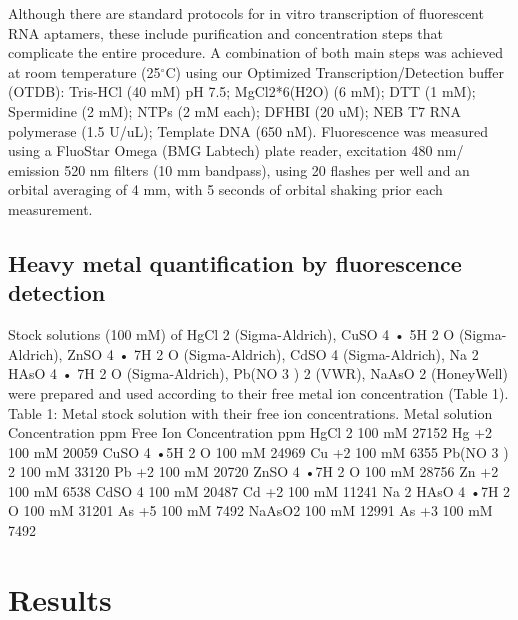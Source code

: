 Although there are standard protocols for in vitro transcription of fluorescent RNA aptamers, these include purification and concentration steps that complicate the entire procedure. A combination of both main steps was achieved at room temperature (25$^{\circ}$C) using our Optimized Transcription/Detection buffer (OTDB): Tris-HCl (40 mM) pH 7.5; MgCl2*6(H2O) (6 mM); DTT (1 mM); Spermidine (2 mM); NTPs (2 mM each); DFHBI (20 uM); NEB T7 RNA polymerase (1.5 U/uL); Template DNA (650 nM). 
Fluorescence was measured using a FluoStar Omega (BMG Labtech) plate reader, excitation 480 nm/ emission 520 nm filters (10 mm bandpass), using 20 flashes per well and an orbital averaging of 4 mm, with 5 seconds of orbital shaking prior each measurement. 

\subsection*{Heavy metal quantification by fluorescence detection}
Stock solutions (100 mM) of HgCl 2 (Sigma-Aldrich), CuSO 4 • 5H 2 O (Sigma-Aldrich), ZnSO 4 • 7H 2 O
(Sigma-Aldrich), CdSO 4 (Sigma-Aldrich), Na 2 HAsO 4 • 7H 2 O (Sigma-Aldrich), Pb(NO 3 ) 2 (VWR), NaAsO 2
(HoneyWell) were prepared and used according to their free metal ion concentration (Table 1).
Table 1: Metal stock solution with their free ion concentrations.
Metal solution Concentration ppm Free Ion Concentration ppm
HgCl 2 100 mM 27152 Hg +2 100 mM 20059
CuSO 4 •5H 2 O 100 mM 24969 Cu +2 100 mM 6355
Pb(NO 3 ) 2 100 mM 33120 Pb +2 100 mM 20720
ZnSO 4 •7H 2 O 100 mM 28756 Zn +2 100 mM 6538
CdSO 4 100 mM 20487 Cd +2 100 mM 11241
Na 2 HAsO 4 •7H 2 O 100 mM 31201 As +5 100 mM 7492
NaAsO2 100 mM 12991 As +3 100 mM 7492

\section{\textbf{Results}}


